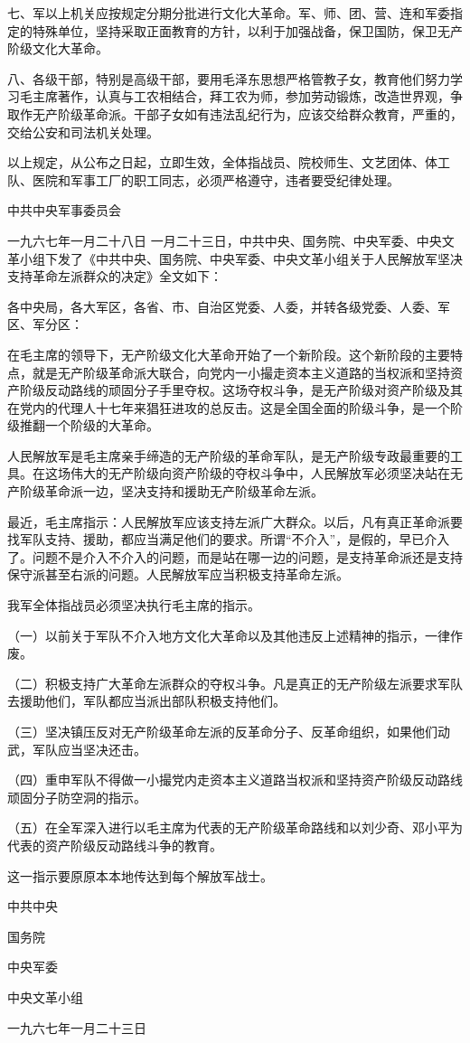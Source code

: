 \begin{maonote}
七、军以上机关应按规定分期分批进行文化大革命。军、师、团、营、连和军委指定的特殊单位，坚持采取正面教育的方针，以利于加强战备，保卫国防，保卫无产阶级文化大革命。

八、各级干部，特别是高级干部，要用毛泽东思想严格管教子女，教育他们努力学习毛主席著作，认真与工农相结合，拜工农为师，参加劳动锻炼，改造世界观，争取作无产阶级革命派。干部子女如有违法乱纪行为，应该交给群众教育，严重的，交给公安和司法机关处理。

以上规定，从公布之日起，立即生效，全体指战员、院校师生、文艺团体、体工队、医院和军事工厂的职工同志，必须严格遵守，违者要受纪律处理。

中共中央军事委员会

一九六七年一月二十八日
一月二十三日，中共中央、国务院、中央军委、中央文革小组下发了《中共中央、国务院、中央军委、中央文革小组关于人民解放军坚决支持革命左派群众的决定》全文如下：

各中央局，各大军区，各省、市、自治区党委、人委，并转各级党委、人委、军区、军分区：

在毛主席的领导下，无产阶级文化大革命开始了一个新阶段。这个新阶段的主要特点，就是无产阶级革命派大联合，向党内一小撮走资本主义道路的当权派和坚持资产阶级反动路线的顽固分子手里夺权。这场夺权斗争，是无产阶级对资产阶级及其在党内的代理人十七年来猖狂进攻的总反击。这是全国全面的阶级斗争，是一个阶级推翻一个阶级的大革命。

人民解放军是毛主席亲手缔造的无产阶级的革命军队，是无产阶级专政最重要的工具。在这场伟大的无产阶级向资产阶级的夺权斗争中，人民解放军必须坚决站在无产阶级革命派一边，坚决支持和援助无产阶级革命左派。

最近，毛主席指示：人民解放军应该支持左派广大群众。以后，凡有真正革命派要找军队支持、援助，都应当满足他们的要求。所谓“不介入”，是假的，早已介入了。问题不是介入不介入的问题，而是站在哪一边的问题，是支持革命派还是支持保守派甚至右派的问题。人民解放军应当积极支持革命左派。

我军全体指战员必须坚决执行毛主席的指示。

（一）以前关于军队不介入地方文化大革命以及其他违反上述精神的指示，一律作废。

（二）积极支持广大革命左派群众的夺权斗争。凡是真正的无产阶级左派要求军队去援助他们，军队都应当派出部队积极支持他们。

（三）坚决镇压反对无产阶级革命左派的反革命分子、反革命组织，如果他们动武，军队应当坚决还击。

（四）重申军队不得做一小撮党内走资本主义道路当权派和坚持资产阶级反动路线顽固分子防空洞的指示。

（五）在全军深入进行以毛主席为代表的无产阶级革命路线和以刘少奇、邓小平为代表的资产阶级反动路线斗争的教育。

这一指示要原原本本地传达到每个解放军战士。

中共中央

国务院

中央军委

中央文革小组

一九六七年一月二十三日
\end{maonote}
